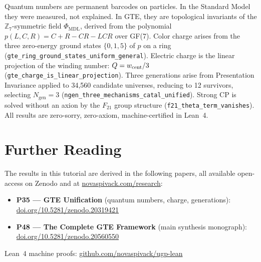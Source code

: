 \documentclass[11pt,a4paper]{article}
\newcommand{\lean}[1]{\texttt{#1}}
\newcommand{\Ngen}{N_{\mathrm{gen}}}
\newcommand{\PHIMDL}{\Phi_{\mathrm{MDL}}}
\begin{document}
\bigskip
\begin{tcolorbox}[colback=boxblue,colframe=blue!40!black,
  title={One-paragraph summary}]
Quantum numbers are permanent barcodes on particles.  In the Standard Model
they were measured, not explained.  In GTE, they are topological invariants
of the $\mathbb{Z}_7$-symmetric field $\PHIMDL$, derived from the
polynomial $p(L,C,R) = C{+}R{-}CR{-}LCR$ over GF(7).  Color charge arises
from the three zero-energy ground states $\{0,1,5\}$ of $p$ on a ring
(\lean{gte\_ring\_ground\_states\_uniform\_general}).  Electric charge is the
linear projection of the winding number: $Q = w_{\rm cent}/3$
(\lean{gte\_charge\_is\_linear\_projection}).  Three generations arise from
Presentation Invariance applied to 34,560 candidate universes, reducing to
12 survivors, selecting $\Ngen = 3$ (\lean{ngen\_three\_mechanisms\_catal\_unified}).
Strong CP is solved without an axion by the $F_{21}$ group structure
(\lean{f21\_theta\_term\_vanishes}).  All results are zero-sorry,
zero-axiom, machine-certified in Lean~4.
\end{tcolorbox}


\section*{Further Reading}
\begin{tcolorbox}[colback=orange!8,colframe=orange!50!black,
  title=\textbf{Primary Sources}]
The results in this tutorial are derived in the following papers,
all available open-access on Zenodo and at
\href{https://novaspivack.com/research}{novaspivack.com/research}:
\begin{itemize}
  \item \textbf{P35 --- GTE Unification} (quantum numbers, charge, generations):\\
        \href{https://doi.org/10.5281/zenodo.20319421}{doi.org/10.5281/zenodo.20319421}
  \item \textbf{P48 --- The Complete GTE Framework} (main synthesis monograph):\\
        \href{https://doi.org/10.5281/zenodo.20560550}{doi.org/10.5281/zenodo.20560550}
\end{itemize}
Lean~4 machine proofs: \href{https://github.com/novaspivack/ugp-lean}{github.com/novaspivack/ugp-lean}
\end{tcolorbox}


\end{document}
